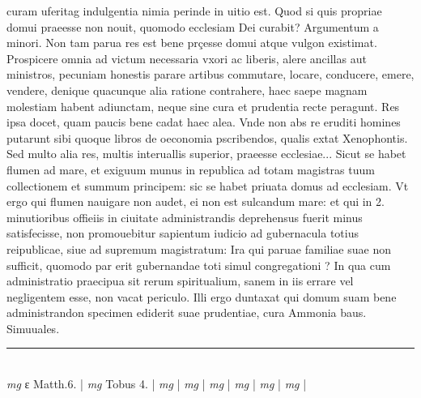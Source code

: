 \documentclass{article}
\begin{document}
\begin{pages}
curam uferitag indulgentia nimia perinde in uitio est.  \pend\pstart Quod si quis propriae domui praeesse non nouit, quomodo ecclesiam Dei curabit? Argumentum a minori. Non tam parua res est bene prçesse domui atque vulgon existimat. Prospicere omnia ad victum necessaria vxori ac liberis, alere ancillas aut ministros, pecuniam honestis parare artibus commutare, locare, conducere, emere, vendere, denique quacunque alia ratione contrahere, haec saepe magnam molestiam habent adiunctam, neque sine cura et prudentia recte peragunt. Res ipsa docet, quam paucis bene cadat haec alea. Vnde non abs re eruditi homines putarunt sibi quoque libros de oeconomia pscribendos, qualis extat Xenophontis. Sed multo alia res, multis interuallis superior, praeesse ecclesiae... Sicut se habet flumen ad mare, et exiguum munus in republica ad totam magistras tuum collectionem et summum principem: sic se habet priuata domus ad ecclesiam. Vt ergo qui flumen nauigare non audet, ei non est sulcandum mare: et qui in 2. minutioribus offieiis in ciuitate administrandis deprehensus fuerit minus satisfecisse, non promouebitur sapientum iudicio ad gubernacula totius reipublicae, siue ad supremum magistratum: Ira qui paruae familiae suae non sufficit, quomodo par erit gubernandae toti simul congregationi ? In qua cum administratio praecipua sit rerum spiritualium, sanem in iis errare vel negligentem esse, non vacat periculo. Illi ergo duntaxat qui domum suam bene administrandon specimen ediderit suae prudentiae, cura Ammonia baus. Simuuales.  \pend
\vspace{0.5cm}\noindent
\vspace{0.2cm}\rule{1cm}{0.2pt}\\ 
\hspace{0.2cm}\textit{mg}
\footnotesize ε Matth.6. 
\normalsize| 
\hspace{0.2cm}\textit{mg}
\footnotesize Tobus 4. 
\normalsize| 
\hspace{0.2cm}\textit{mg}
\footnotesize 
\normalsize| 
\hspace{0.2cm}\textit{mg}
\footnotesize 
\normalsize| 
\hspace{0.2cm}\textit{mg}
\footnotesize 
\normalsize| 
\hspace{0.2cm}\textit{mg}
\footnotesize 
\normalsize| 
\hspace{0.2cm}\textit{mg}
\footnotesize 
\normalsize| 
\hspace{0.2cm}\textit{mg}
\footnotesize 
\normalsize| 

\end{pages}
\end{document}
